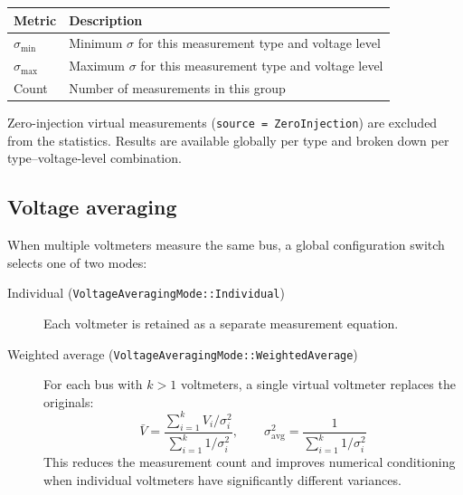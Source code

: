 \documentclass[11pt,a4paper]{article}
\begin{document}
\begin{center}
\small
\begin{tabular}{lp{70mm}}
  \toprule
  \textbf{Metric} & \textbf{Description} \\
  \midrule
  $\sigma_\text{min}$ & Minimum $\sigma$ for this measurement type and voltage level \\
  $\sigma_\text{max}$ & Maximum $\sigma$ for this measurement type and voltage level \\
  Count               & Number of measurements in this group \\
  \bottomrule
\end{tabular}
\end{center}

\noindent
Zero-injection virtual measurements (\texttt{source = ZeroInjection}) are
excluded from the statistics.  Results are available globally per type
and broken down per type--voltage-level combination.

\subsection{Voltage averaging}\label{sec:volt-avg}

When multiple voltmeters measure the same bus, a global configuration
switch selects one of two modes:

\begin{description}
  \item[Individual (\texttt{VoltageAveragingMode::Individual})]
    Each voltmeter is retained as a separate measurement equation.
  \item[Weighted average (\texttt{VoltageAveragingMode::WeightedAverage})]
    For each bus with $k > 1$ voltmeters, a single virtual voltmeter
    replaces the originals:
    \begin{equation}
      \bar{V} = \frac{\sum_{i=1}^{k} V_i / \sigma_i^2}
                     {\sum_{i=1}^{k} 1/\sigma_i^2}, \qquad
      \sigma_\text{avg}^2 = \frac{1}{\sum_{i=1}^{k} 1/\sigma_i^2}
    \end{equation}
    This reduces the measurement count and improves numerical conditioning
    when individual voltmeters have significantly different variances.
\end{description}


\end{document}
